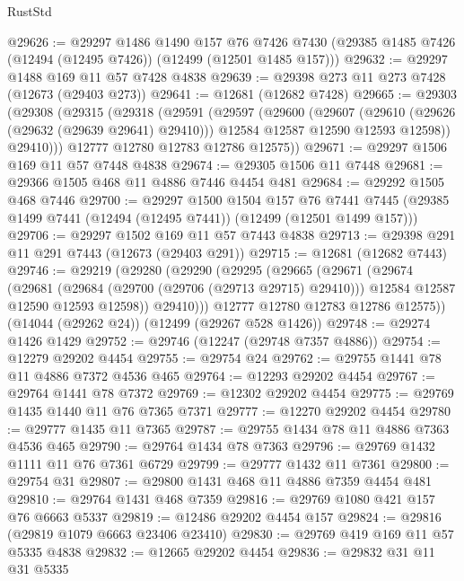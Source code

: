 \begin{lexlean}{RustStd}
\begin{coremodule}
{\begin{coremodule}
{{{{{{{{{{{{{{{{{{{{{{{{{{{{{{{{{{{{{{{{{{{{{{{{{{{{{{{{{{{{{{{{{{{{{{{{{{{{{{{{@29626 := @29297
    @1486
    @1490
    @157
    @76
    @7426
    @7430
    (@29385 @1485 @7426 (@12494 (@12495 @7426)) (@12499 (@12501 @1485 @157)))
@29632 := @29297 @1488 @169 @11 @57 @7428 @4838
@29639 := @29398 @273 @11 @273 @7428 (@12673 (@29403 @273))
@29641 := @12681 (@12682 @7428)
@29665 := @29303
    (@29308
      (@29315
        (@29318
          (@29591
            (@29597
              (@29600
                (@29607
                  (@29610 (@29626 (@29632 (@29639 @29641) @29410)))
                  @12584
                  @12587
                  @12590
                  @12593
                  @12598))
              @29410)))
        @12777
        @12780
        @12783
        @12786
        @12575))
@29671 := @29297 @1506 @169 @11 @57 @7448 @4838
@29674 := @29305 @1506 @11 @7448
@29681 := @29366 @1505 @468 @11 @4886 @7446 @4454 @481
@29684 := @29292 @1505 @468 @7446
@29700 := @29297
    @1500
    @1504
    @157
    @76
    @7441
    @7445
    (@29385 @1499 @7441 (@12494 (@12495 @7441)) (@12499 (@12501 @1499 @157)))
@29706 := @29297 @1502 @169 @11 @57 @7443 @4838
@29713 := @29398 @291 @11 @291 @7443 (@12673 (@29403 @291))
@29715 := @12681 (@12682 @7443)
@29746 := @29219
    (@29280
      (@29290
        (@29295
          (@29665
            (@29671
              (@29674
                (@29681
                  (@29684 (@29700 (@29706 (@29713 @29715) @29410)))
                  @12584
                  @12587
                  @12590
                  @12593
                  @12598))
              @29410)))
        @12777
        @12780
        @12783
        @12786
        @12575))
    (@14044 (@29262 @24))
    (@12499 (@29267 @528 @1426))
@29748 := @29274 @1426 @1429
@29752 := @29746 (@12247 (@29748 @7357 @4886))
@29754 := @12279 @29202 @4454
@29755 := @29754 @24
@29762 := @29755 @1441 @78 @11 @4886 @7372 @4536 @465
@29764 := @12293 @29202 @4454
@29767 := @29764 @1441 @78 @7372
@29769 := @12302 @29202 @4454
@29775 := @29769 @1435 @1440 @11 @76 @7365 @7371
@29777 := @12270 @29202 @4454
@29780 := @29777 @1435 @11 @7365
@29787 := @29755 @1434 @78 @11 @4886 @7363 @4536 @465
@29790 := @29764 @1434 @78 @7363
@29796 := @29769 @1432 @1111 @11 @76 @7361 @6729
@29799 := @29777 @1432 @11 @7361
@29800 := @29754 @31
@29807 := @29800 @1431 @468 @11 @4886 @7359 @4454 @481
@29810 := @29764 @1431 @468 @7359
@29816 := @29769 @1080 @421 @157 @76 @6663 @5337
@29819 := @12486 @29202 @4454 @157
@29824 := @29816 (@29819 @1079 @6663 @23406 @23410)
@29830 := @29769 @419 @169 @11 @57 @5335 @4838
@29832 := @12665 @29202 @4454
@29836 := @29832 @31 @11 @31 @5335
}}}}}}}}}}}}}}}}}}}}}}}}}}}}}}}}}}}}}}}}}}}}}}}}}}}}}}}}}}}}}}}}}}}}}}}}}}}}}}}}
\end{coremodule}}
\end{coremodule}
\end{lexlean}
